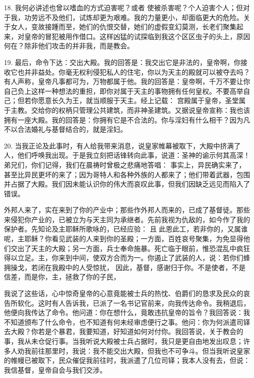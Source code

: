 18. 我何必讲述也曾以嗜血的方式迫害呢？或者 使被杀害呢？个人迫害个人；但对于我，功劳远不及他们，试炼却更为艰难。我的力量更小，却面临更大的危险。关于女人，变故接踵而至，她们的仇恨交替，她们的虚假变幻莫测，长老们聚集起来，对皇帝的冒犯被用作借口。这样凶猛的试探临到我这个区区虫子的头上，原因何在？除非他们攻击的并非我，而是教会。\par

19. 最后，命令下达：交出大殿。我的回答是：我交出它是非法的，皇帝啊，你接收它也并非益处。你毫无权利侵犯私人的住宅，你以为天主的殿就可以被夺去吗？有人声称，皇帝凡事都可为，万物都属于他。我的回答是：皇帝啊，千万不要让你自己负上这样一种想法的重担，即你对属于天主的事物拥有任何皇权。不要高举自己；但若你愿意长久为王，就当顺服于天主。经上记载： 宫殿属于皇帝，圣堂属于主教。交给你的权柄只管理公共建筑，而非神圣建筑。又据说皇帝宣称：我也该拥有一座大殿。我的回答是：你拥有它是不合法的。你与淫妇有什么相干？因为凡不以合法婚礼与基督结合的，就是淫妇。\par

20. 当我正论及此事时，有人给我带来消息，说皇家帷幕被取下，大殿中挤满了人，他们呼唤我出现。于是我立刻把话锋转向此事，说道：圣神的谕示何其高深！弟兄们，你们记得，我们在晨祷时曾极之悲痛地答唱： 事实上，异民确实来了，甚至比异民更坏的来了；因为哥特人和各种外族的人都来了；他们带着武器，包围并占据了大殿。我们因未能认识你的伟大而哀叹此事，但我们因缺乏远见而陷入了错误。\par

外邦人来了，实在来到了你的产业中；那些作外邦人而来的，已成了基督徒。那些来侵犯你产业的，已被立为与天主同为承继者。先前我视为仇敌的，如今作了我的保护者。先知论及主耶稣所歌咏的，已经应验： 且  此恩此工，若非你的，又属谁呢，主耶稣？你看见武装的人来到你的圣殿；一方面，百姓哀号聚集，为免显得他们交出了天主的大殿；另一方面，兵士奉命施暴。死亡临于眼前，惟恐混乱中疯狂得以立足。主，你来到中间，使双方合而为一。你遏止了武装的人，说：若你们蜂拥操戈，若闭在我殿中的人受惊扰， 因此，基督，感谢归于你。不是使者，不是信差，而是你，主，拯救了你的子民，\par

我说了这些话，心中惊奇皇帝的心意竟能被士兵的热忱、伯爵们的恳求及民众的哀告所软化。这时有人告诉我，已派了一名书记官前来，向我传达命令。我稍退后，他便向我传达了命令。他问道：你在想什么，竟敢违抗皇帝的旨令？我回答说：我不知道颁布了什么命令，也不知道有何未经审虑便行之事。他问：你为何派遣司铎去大殿？你若是个暴君，我要知道，好知道如何对付你。我回答说，关于教会的事，我从未仓促行事。当我听说大殿被士兵占据时，我只是更自由地发出叹息；许多人劝我前往那里时，我说：我不能交出大殿，但我也不可争斗。但当我听说皇家的帷幔已被取下，民众催促我前往时，我派遣了几位司铎；我本人没有去，但说：我信基督，皇帝自会与我们交涉。\par

